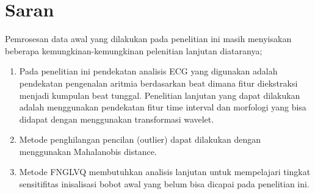 \section{Saran}
Pemrosesan data awal yang dilakukan pada penelitian ini masih menyisakan
beberapa kemungkinan-kemungkinan pelenitian lanjutan diataranya;
\begin{enumerate}
  \item Pada penelitian ini pendekatan analisis ECG yang digunakan adalah
  pendekatan pengenalan aritmia berdasarkan beat dimana fitur
  diekstraksi menjadi kumpulan beat tunggal. Penelitian lanjutan yang dapat
  dilakukan adalah menggunakan pendekatan fitur time interval dan
  morfologi yang bisa didapat dengan menggunakan transformasi
  wavelet.
  \item Metode penghilangan pencilan (outlier) dapat dilakukan dengan
  menggunakan Mahalanobis distance.
  \item Metode FNGLVQ membutuhkan analisis lanjutan untuk mempelajari tingkat
  sensitifitas inisalisasi bobot awal yang belum bisa dicapai pada penelitian
  ini.
\end{enumerate}
